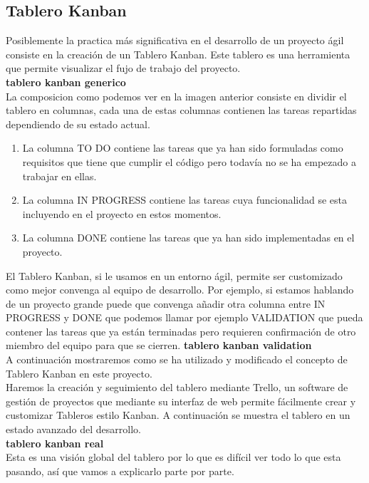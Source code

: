 \documentclass[12pt,a4paper]{article}
\begin{document}
	\subsection{Tablero Kanban}
	Posiblemente la practica más significativa en el desarrollo de un proyecto ágil consiste en la creación de un Tablero Kanban. Este tablero es una herramienta que permite visualizar el fujo de trabajo del proyecto.\\
		\textbf{tablero kanban generico}\\
	La composicion como podemos ver en la imagen anterior consiste en dividir el tablero en columnas, cada una de estas columnas contienen las tareas repartidas dependiendo de su estado actual.\\
	\begin{enumerate}
	\item La columna TO DO contiene las tareas que ya han sido formuladas como requisitos que tiene que cumplir el código pero todavía no se ha empezado a trabajar en ellas.
	\item La columna IN PROGRESS contiene las tareas cuya funcionalidad se esta incluyendo en el proyecto en estos momentos.
	\item La columna DONE contiene las tareas que ya han sido implementadas en el proyecto.
	\end{enumerate}
	 El Tablero Kanban, si le usamos en un entorno ágil, permite ser customizado como mejor convenga al equipo de desarrollo. Por ejemplo, si estamos hablando de un proyecto grande puede que convenga añadir otra columna entre IN PROGRESS y DONE que podemos llamar por ejemplo VALIDATION que pueda contener las tareas que ya están terminadas pero requieren confirmación de otro miembro del equipo para que se cierren.
	\textbf{tablero kanban validation}\\
	A continuación mostraremos como se ha utilizado y modificado el concepto de Tablero Kanban en este proyecto.\\
	Haremos la creación y seguimiento del tablero mediante Trello, un software de gestión de proyectos que mediante su interfaz de web permite fácilmente crear y customizar Tableros estilo Kanban. A continuación se muestra el tablero en un estado avanzado del desarrollo.\\
	\textbf{tablero kanban real}\\
	Esta es una visión global del tablero por lo que es difícil ver todo lo que esta pasando, así que vamos a explicarlo parte por parte.\\
\end{document}
